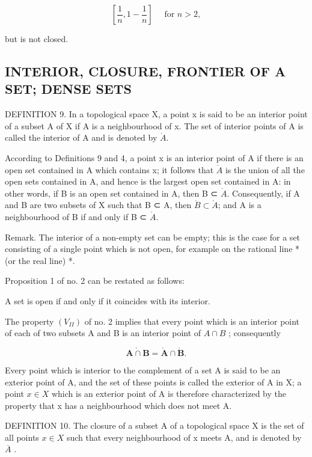 \[
\left[ \frac {1}{n}, 1 - \frac {1}{n} \right] \quad \text { for } n > 2,
\]

but is not closed.

\subsection{INTERIOR, CLOSURE, FRONTIER OF A SET; DENSE SETS}

DEFINITION 9. In a topological space X, a point x is said to be an interior point of a subset A of X if A is a neighbourhood of x. The set of interior points of A is called the interior of A and is denoted by \(\mathring{A}\).

According to Definitions 9 and 4, a point x is an interior point of A if there is an open set contained in A which contains x; it follows that \(\mathring{A}\) is the union of all the open sets contained in A, and hence is the largest open set contained in A: in other words, if B is an open set contained in A, then B ⊂ \(\mathring{A}\). Consequently, if A and B are two subsets of X such that B ⊂ A, then \(\mathring{B} \subset \mathring{A}\); and A is a neighbourhood of B if and only if B ⊂ \(\mathring{A}\).

Remark. The interior of a non-empty set can be empty; this is the case for a set consisting of a single point which is not open, for example on the rational line * (or the real line) *.

Proposition 1 of no. 2 can be restated as follows:

A set is open if and only if it coincides with its interior.

The property \((V_{II})\) of no. 2 implies that every point which is an interior point of each of two subsets A and B is an interior point of \(A \cap B\) ; consequently

\[
\mathring {\mathbf {A} \cap \mathbf {B}} = \mathring {\mathbf {A}} \cap \mathring {\mathbf {B}}.\tag{1}
\]

Every point which is interior to the complement of a set A is said to be an exterior point of A, and the set of these points is called the exterior of A in X; a point \(x \in X\) which is an exterior point of A is therefore characterized by the property that x has a neighbourhood which does not meet A.

DEFINITION 10. The closure of a subset A of a topological space X is the set of all points \(x \in X\) such that every neighbourhood of x meets A, and is denoted by \(\overline{A}\) .

